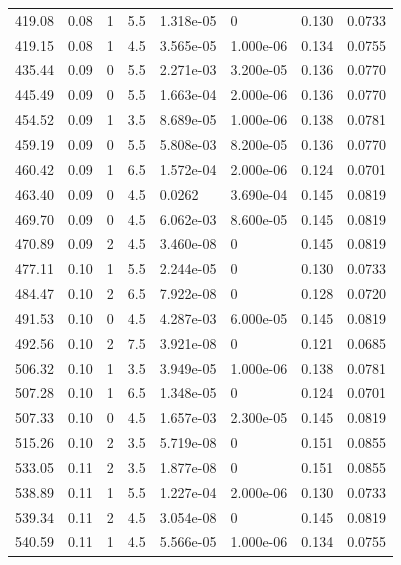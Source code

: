 \documentclass[preview]{standalone}
\begin{document}
{{{\begin{tabular}{L{1.2cm}C{1.2cm} C{0.3cm}C{0.5cm} C{1.4cm}C{1.4cm} C{1.4cm}C{1.4cm}}
  419.08  &  0.08  & 1     & 5.5 &  1.318e-05  & 0  & 0.130 &  0.0733   \\ 
  419.15  &  0.08  & 1     & 4.5 &  3.565e-05  & 1.000e-06  & 0.134 &  0.0755   \\ 
  435.44  &  0.09  & 0     & 5.5 &  2.271e-03  & 3.200e-05  & 0.136 &  0.0770   \\ 
  445.49  &  0.09  & 0     & 5.5 &  1.663e-04  & 2.000e-06  & 0.136 &  0.0770   \\ 
  454.52  &  0.09  & 1     & 3.5 &  8.689e-05  & 1.000e-06  & 0.138 &  0.0781   \\ 
  459.19  &  0.09  & 0     & 5.5 &  5.808e-03  & 8.200e-05  & 0.136 &  0.0770   \\ 
  460.42  &  0.09  & 1     & 6.5 &  1.572e-04  & 2.000e-06  & 0.124 &  0.0701   \\ 
  463.40  &  0.09  & 0     & 4.5 &  0.0262  & 3.690e-04  & 0.145 &  0.0819   \\ 
  469.70  &  0.09  & 0     & 4.5 &  6.062e-03  & 8.600e-05  & 0.145 &  0.0819   \\ 
  470.89  &  0.09  & 2     & 4.5 &  3.460e-08  & 0  & 0.145 &  0.0819   \\ 
  477.11  &  0.10  & 1     & 5.5 &  2.244e-05  & 0  & 0.130 &  0.0733   \\ 
  484.47  &  0.10  & 2     & 6.5 &  7.922e-08  & 0  & 0.128 &  0.0720   \\ 
  491.53  &  0.10  & 0     & 4.5 &  4.287e-03  & 6.000e-05  & 0.145 &  0.0819   \\ 
  492.56  &  0.10  & 2     & 7.5 &  3.921e-08  & 0  & 0.121 &  0.0685   \\ 
  506.32  &  0.10  & 1     & 3.5 &  3.949e-05  & 1.000e-06  & 0.138 &  0.0781   \\ 
  507.28  &  0.10  & 1     & 6.5 &  1.348e-05  & 0  & 0.124 &  0.0701   \\ 
  507.33  &  0.10  & 0     & 4.5 &  1.657e-03  & 2.300e-05  & 0.145 &  0.0819   \\ 
  515.26  &  0.10  & 2     & 3.5 &  5.719e-08  & 0  & 0.151 &  0.0855   \\ 
  533.05  &  0.11  & 2     & 3.5 &  1.877e-08  & 0  & 0.151 &  0.0855   \\ 
  538.89  &  0.11  & 1     & 5.5 &  1.227e-04  & 2.000e-06  & 0.130 &  0.0733   \\ 
  539.34  &  0.11  & 2     & 4.5 &  3.054e-08  & 0  & 0.145 &  0.0819   \\ 
  540.59  &  0.11  & 1     & 4.5 &  5.566e-05  & 1.000e-06  & 0.134 &  0.0755   \\ 

\end{tabular}}}}
\end{document}
